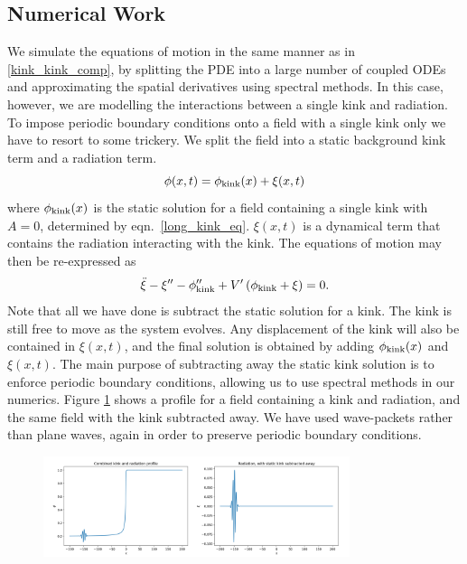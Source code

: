 \documentclass[11pt, oneside,titlepage]{article}  	%
\numberwithin{equation}{section}
\begin{document}
 \subsection{Numerical Work} \label{kink_rad_numerics}
We simulate the equations of motion in the same manner as in \textsection \ref{kink_kink_comp}, by splitting the PDE into a large number of coupled ODEs and approximating the spatial derivatives using spectral methods. In this case, however, we are modelling the interactions between a single kink and radiation. To impose periodic boundary conditions onto a field with a single kink only we have to resort to some trickery. We split the field into a static background kink term and a radiation term.
\begin{equation}
\phi(x,t) = \phi_{\textup{kink}}(x) + \xi(x,t)
\end{equation}
where $\phi_{\textup{kink}}(x)$ is the static solution for a field containing a single kink with $A=0$, determined by eqn.~\ref{long_kink_eq}. $\xi(x,t)$ is a dynamical term that contains the radiation interacting with the kink. The equations of motion may then be re-expressed as
\begin{equation}
\ddot{\xi} - \xi'' - \phi''_\textup{kink} + V' \left( \phi_\textup{kink} + \xi \right)= 0.
\end{equation}
Note that all we have done is subtract the static solution for a kink. The kink is still free to move as the system evolves. Any displacement of the kink will also be contained in $\xi(x,t)$, and the final solution is obtained by adding $ \phi_{\textup{kink}}(x)$ and $\xi(x,t)$. The main purpose of subtracting away the static kink solution is to enforce periodic boundary conditions, allowing us to use spectral methods in our numerics. Figure \ref{kink-rad-init} shows a profile for a field containing a kink and radiation, and the same field with the kink subtracted away. We have used wave-packets rather than plane waves, again in order to preserve periodic boundary conditions.\par
\begin{figure}
\centering
\includegraphics[width=0.8\textwidth]{kink_rad_init}
 \label{kink-rad-init}
\end{figure}
\end{document}
